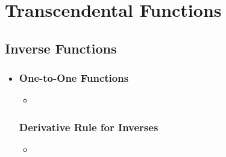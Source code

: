 \chapter{Transcendental Functions}

\section{Inverse Functions}
\begin{itemize}
  \item []

  \subsection{One-to-One Functions}
  \begin{itemize}
    \item 
  \end{itemize}

  \subsection{Derivative Rule for Inverses}
  \begin{itemize}
    \item 
  \end{itemize}

\end{itemize}

